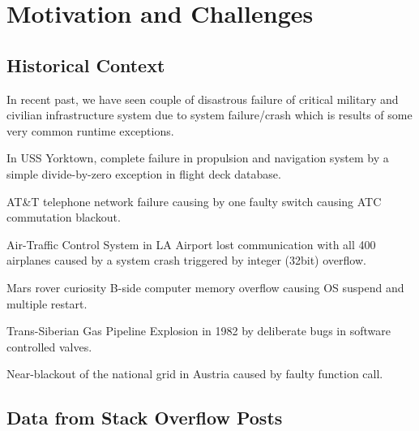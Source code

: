 \section{Motivation and Challenges}
\label{sec:motivation}

\subsection{Historical Context}
\label{subsec:historicalContext}

In recent past, we have seen couple of disastrous failure of critical military
and civilian infrastructure system due to system failure/crash which is results
of some very common runtime exceptions.

\begin{mylist}
  
  \item In USS Yorktown, complete failure in propulsion and navigation system by
  a simple divide-by-zero exception in flight deck database.
  
  \item AT\&T telephone network failure causing by one faulty switch causing ATC
  commutation blackout.
  
  \item Air-Traffic Control System in LA Airport lost communication with all 400
  airplanes caused by a system crash triggered by integer (32bit) overflow.
  
  \item Mars rover curiosity B-side computer memory overflow causing OS suspend
  and multiple restart.
  
  \item Trans-Siberian Gas Pipeline Explosion in 1982 by deliberate bugs in
  software controlled valves.
  
  \item Near-blackout of the national grid in Austria caused by faulty function
  call.
  
  
\end{mylist}


\subsection{Data from Stack Overflow Posts}
\label{subsec:stackoverflow}

